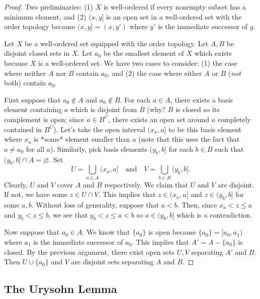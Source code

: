 \documentclass{article}
\newcommand{\nline}{\vspace*{0.5\baselineskip}}
\theoremstyle{definition}
\begin{document}
\begin{flushleft}
\begin{proof}
Two preliminaries: (1) $X$ is well-ordered if every nonempty subset has a minimum element, and (2) $(x, y]$ is an open set in a well-ordered set with the order topology because $(x, y] = (x, y')$ where $y'$ is the immediate successor of $y$.

\nline

Let $X$ be a well-ordered set equipped with the order topology. Let $A, B$ be disjoint closed sets in $X$. Let $a_0$ be the smallest element of $X$ which exists because $X$ is a well-ordered set. We have two cases to consider: (1) the case where neither $A$ nor $B$ contain $a_0$, and (2) the case where either $A$ or $B$ (\textit{not} both) contain $a_0$.

\nline

First suppose that $a_0 \notin A$ and $a_0 \notin B$. For each $a \in A$, there exists a basis element containing $a$ which is disjoint from $B$ (why? $B$ is closed so its complement is open; since $a \in B^C$, there exists an open set around $a$ completely contained in $B^C$). Let's take the open interval $(x_a, a]$ to be this basis element where $x_a$ is *some* element smaller than $a$ (note that this uses the fact that $a \neq a_0$ for all $a$). Similarly, pick basis elements $(y_b, b]$ for each $b \in B$ such that $(y_b, b] \cap A = \varnothing$. Set
\[
U = \bigcup_{a \in A} (x_a, a] \quad \text{and} \quad V = \bigcup_{b \in B} (y_b, b].
\]
Clearly, $U$ and $V$ cover $A$ and $B$ respectively. We claim that $U$ and $V$ are disjoint. If not, we have some $z \in U \cap V$. This implies that $z \in (x_a, a]$ and $z \in (y_b, b]$ for some $a, b$. Without loss of generality, suppose that $a < b$. Then, since $x_a < z \leq a$ and $y_b < z \leq b$, we see that $y_b < z \leq a < b$ so $a \in (y_b, b]$ which is a contradiction.

\nline

Now suppose that $a_0 \in A$. We know that $\{a_0\}$ is open because $\{a_0\} = [a_0, a_1)$ where $a_1$ is the immediate successor of $a_0$. This implies that $A' = A - \{a_0\}$ is closed. By the previous argument, there exist open sets $U, V$ separating $A'$ and $B$. Then $U \cup \{a_0\}$ and $V$ are disjoint sets separating $A$ and $B$.
\end{proof}

\subsection{The Urysohn Lemma}


\end{flushleft}
\end{document}
